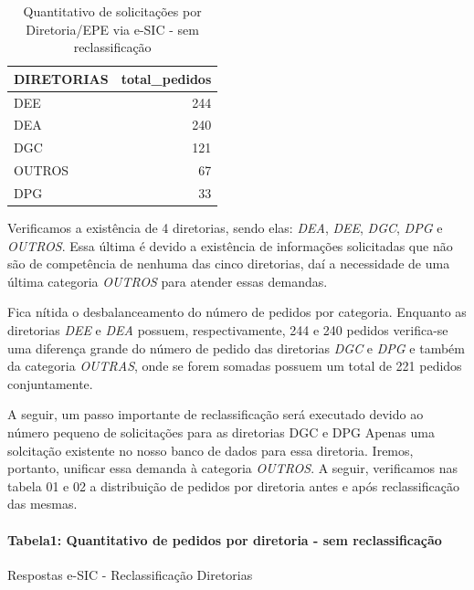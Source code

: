 \documentclass[]{article}
\newenvironment{Shaded}{\begin{snugshade}}{\end{snugshade}}
\newcommand{\KeywordTok}[1]{\textcolor[rgb]{0.13,0.29,0.53}{\textbf{#1}}}
\newcommand{\DataTypeTok}[1]{\textcolor[rgb]{0.13,0.29,0.53}{#1}}
\newcommand{\StringTok}[1]{\textcolor[rgb]{0.31,0.60,0.02}{#1}}
\newcommand{\OperatorTok}[1]{\textcolor[rgb]{0.81,0.36,0.00}{\textbf{#1}}}
\newcommand{\NormalTok}[1]{#1}
\let\oldparagraph\paragraph
\renewcommand{\paragraph}[1]{\oldparagraph{#1}\mbox{}}
\begin{document}
\begin{table}[!h]

\caption{\label{tab:unnamed-chunk-19}Quantitativo de solicitações por Diretoria/EPE via e-SIC - sem reclassificação}
\centering
\begin{tabular}{lr}
\toprule
DIRETORIAS & total\_pedidos\\
\midrule
\rowcolor{gray!6}  DEE & 244\\
DEA & 240\\
\rowcolor{gray!6}  DGC & 121\\
OUTROS & 67\\
\rowcolor{gray!6}  DPG & 33\\
\bottomrule
\end{tabular}
\end{table}

Verificamos a existência de 4 diretorias, sendo elas: \emph{DEA},
\emph{DEE}, \emph{DGC}, \emph{DPG} e \emph{OUTROS}. Essa última é devido
a existência de informações solicitadas que não são de competência de
nenhuma das cinco diretorias, daí a necessidade de uma última categoria
\emph{OUTROS} para atender essas demandas.

Fica nítida o desbalanceamento do número de pedidos por categoria.
Enquanto as diretorias \emph{DEE} e \emph{DEA} possuem, respectivamente,
244 e 240 pedidos verifica-se uma diferença grande do número de pedido
das diretorias \emph{DGC} e \emph{DPG} e também da categoria
\emph{OUTRAS}, onde se forem somadas possuem um total de 221 pedidos
conjuntamente.

A seguir, um passo importante de reclassificação será executado devido
ao número pequeno de solicitações para as diretorias DGC e DPG Apenas
uma solcitação existente no nosso banco de dados para essa diretoria.
Iremos, portanto, unificar essa demanda à categoria \emph{OUTROS}. A
seguir, verificamos nas tabela 01 e 02 a distribuição de pedidos por
diretoria antes e após reclassificação das mesmas.

\paragraph{Tabela1: Quantitativo de pedidos por diretoria - sem
reclassificação}\label{tabela1-quantitativo-de-pedidos-por-diretoria---sem-reclassificacao-1}

Respostas e-SIC - Reclassificação Diretorias

\begin{Shaded}
\end{Shaded}
\end{document}
